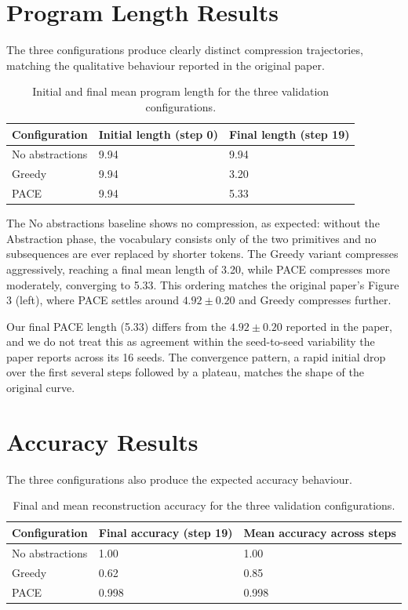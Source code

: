\section{Program Length Results}
\label{sec:appendix-program-length-results}

The three configurations produce clearly distinct compression trajectories, matching the qualitative behaviour reported in the original paper.

\begin{table}[htbp]
\centering
\begin{tabular}{lll}
\toprule
Configuration & Initial length (step 0) & Final length (step 19) \\
\midrule
No abstractions & 9.94 & 9.94 \\
Greedy & 9.94 & 3.20 \\
PACE & 9.94 & 5.33 \\
\bottomrule
\end{tabular}
\caption{Initial and final mean program length for the three validation configurations.}
\label{tab:appendix-program-length-results}
\end{table}

The No abstractions baseline shows no compression, as expected: without the Abstraction phase, the vocabulary consists only of the two primitives and no subsequences are ever replaced by shorter tokens. The Greedy variant compresses aggressively, reaching a final mean length of 3.20, while PACE compresses more moderately, converging to 5.33. This ordering matches the original paper's Figure 3 (left), where PACE settles around $4.92 \pm 0.20$ and Greedy compresses further.

Our final PACE length (5.33) differs from the $4.92 \pm 0.20$ reported in the paper, and we do not treat this as agreement within the seed-to-seed variability the paper reports across its 16 seeds. The convergence pattern, a rapid initial drop over the first several steps followed by a plateau, matches the shape of the original curve.

\section{Accuracy Results}
\label{sec:appendix-accuracy-results}

The three configurations also produce the expected accuracy behaviour.

\begin{table}[htbp]
\centering
\begin{tabular}{lll}
\toprule
Configuration & Final accuracy (step 19) & Mean accuracy across steps \\
\midrule
No abstractions & 1.00 & 1.00 \\
Greedy & 0.62 & 0.85 \\
PACE & 0.998 & 0.998 \\
\bottomrule
\end{tabular}
\caption{Final and mean reconstruction accuracy for the three validation configurations.}
\label{tab:appendix-accuracy-results}
\end{table}

